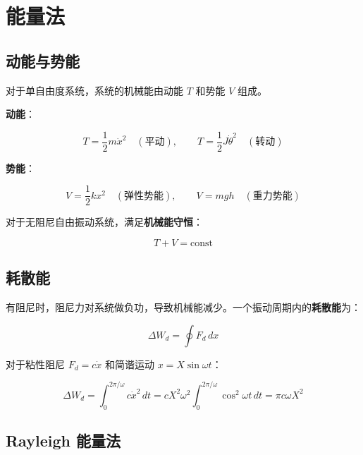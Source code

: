 \section{能量法}

\subsection{动能与势能}

对于单自由度系统，系统的机械能由动能 $T$ 和势能 $V$ 组成。

\textbf{动能}：
\begin{myformula}
    \[
    T = \frac{1}{2}m\dot{x}^2 \quad (\text{平动}),\qquad
    T = \frac{1}{2}J\dot{\theta}^2 \quad (\text{转动})
    \]
\end{myformula}

\textbf{势能}：
\begin{myformula}
    \[
    V = \frac{1}{2}kx^2 \quad (\text{弹性势能}),\qquad
    V = mgh \quad (\text{重力势能})
    \]
\end{myformula}

对于无阻尼自由振动系统，满足\textbf{机械能守恒}：
\begin{myformula}
    \[
    T + V = \text{const}
    \]
\end{myformula}

\subsection{耗散能}

有阻尼时，阻尼力对系统做负功，导致机械能减少。一个振动周期内的\textbf{耗散能}为：
\begin{myformula}
    \[
    \Delta W_d = \oint F_d\,dx
    \]
\end{myformula}

对于粘性阻尼 $F_d = c\dot{x}$ 和简谐运动 $x = X\sin\omega t$：
\begin{myformula}
    \[
    \Delta W_d = \int_0^{2\pi/\omega} c\dot{x}^2\,dt
                = cX^2\omega^2\int_0^{2\pi/\omega}\cos^2\omega t\,dt
                = \pi c\omega X^2
    \]
\end{myformula}

\subsection{Rayleigh 能量法}

